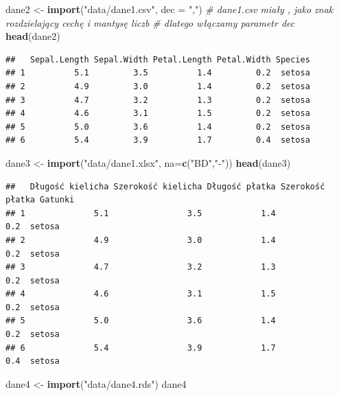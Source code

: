 \documentclass[
]{book}
\newenvironment{Shaded}{\begin{snugshade}}{\end{snugshade}}
\newcommand{\CommentTok}[1]{\textcolor[rgb]{0.56,0.35,0.01}{\textit{#1}}}
\newcommand{\DataTypeTok}[1]{\textcolor[rgb]{0.13,0.29,0.53}{#1}}
\newcommand{\KeywordTok}[1]{\textcolor[rgb]{0.13,0.29,0.53}{\textbf{#1}}}
\newcommand{\NormalTok}[1]{#1}
\newcommand{\StringTok}[1]{\textcolor[rgb]{0.31,0.60,0.02}{#1}}
\theoremstyle{plain}
\theoremstyle{definition}
\theoremstyle{definition}
\theoremstyle{definition}
\theoremstyle{definition}
\theoremstyle{remark}
\begin{document}
\begin{Shaded}
\begin{Highlighting}[]
\NormalTok{dane2 <-}\StringTok{ }\KeywordTok{import}\NormalTok{(}\StringTok{"data/dane1.csv"}\NormalTok{, }\DataTypeTok{dec =} \StringTok{","}\NormalTok{)}
\CommentTok{# dane1.csv miały , jako znak rozdzielający cechę i mantysę liczb}
\CommentTok{# dlatego włączamy parametr dec}
\KeywordTok{head}\NormalTok{(dane2)}
\end{Highlighting}
\end{Shaded}

\begin{verbatim}
##   Sepal.Length Sepal.Width Petal.Length Petal.Width Species
## 1          5.1         3.5          1.4         0.2  setosa
## 2          4.9         3.0          1.4         0.2  setosa
## 3          4.7         3.2          1.3         0.2  setosa
## 4          4.6         3.1          1.5         0.2  setosa
## 5          5.0         3.6          1.4         0.2  setosa
## 6          5.4         3.9          1.7         0.4  setosa
\end{verbatim}

\begin{Shaded}
\begin{Highlighting}[]
\NormalTok{dane3 <-}\StringTok{ }\KeywordTok{import}\NormalTok{(}\StringTok{"data/dane1.xlsx"}\NormalTok{, }\DataTypeTok{na=}\KeywordTok{c}\NormalTok{(}\StringTok{"BD"}\NormalTok{,}\StringTok{"-"}\NormalTok{))}
\KeywordTok{head}\NormalTok{(dane3)}
\end{Highlighting}
\end{Shaded}

\begin{verbatim}
##   Długość kielicha Szerokość kielicha Długość płatka Szerokość płatka Gatunki
## 1              5.1                3.5            1.4              0.2  setosa
## 2              4.9                3.0            1.4              0.2  setosa
## 3              4.7                3.2            1.3              0.2  setosa
## 4              4.6                3.1            1.5              0.2  setosa
## 5              5.0                3.6            1.4              0.2  setosa
## 6              5.4                3.9            1.7              0.4  setosa
\end{verbatim}

\begin{Shaded}
\begin{Highlighting}[]
\NormalTok{dane4 <-}\StringTok{ }\KeywordTok{import}\NormalTok{(}\StringTok{"data/dane4.rds"}\NormalTok{)}
\NormalTok{dane4}
\end{Highlighting}
\end{Shaded}
\end{document}
